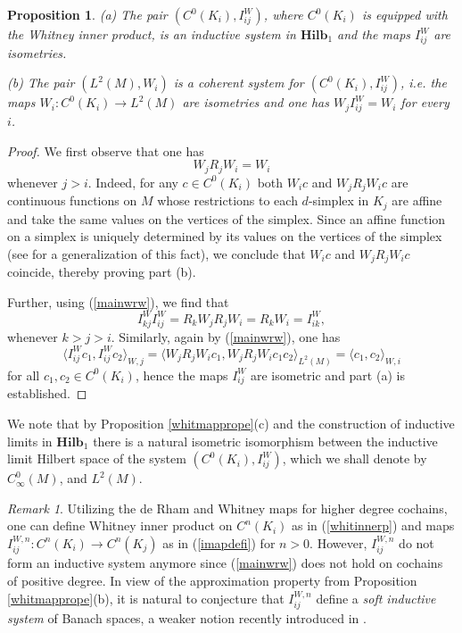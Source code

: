 \documentclass[11pt,reqno]{amsart}
\numberwithin{equation}{section}
\newtheorem{proposition}[theorem]{Proposition}
\theoremstyle{remark}
\newtheorem{remark}[theorem]{Remark}
\theoremstyle{rmdefinition}
\begin{document}
\begin{proposition}\label{indusyswhi}
(a) The pair $( C^0(K_{i}), I_{ij}^{W})$, where $C^0(K_{i})$ is equipped with the Whitney inner product, is an inductive system in $\mathbf{Hilb}_1$  and the maps $I_{ij}^{W}$ are isometries. 

(b) The pair $( L^2(M), W_i)$ is a coherent system for $( C^0(K_{i}), I_{ij}^{W})$, i.e. 
the maps $W_i:  C^0(K_{i}) \rightarrow L^2(M)$ are isometries and one has 
$W_jI_{ij}^{W}=W_i$ for every $i$.

\end{proposition}	
\begin{proof}
We first observe that one has
\begin{equation}\label{mainwrw}
W_jR_jW_i=W_i
\end{equation}
whenever $j>i$. Indeed, for any $c \in  C^0(K_{i})$ both $W_ic$ and $W_jR_jW_ic$ are continuous functions on $M$ whose restrictions to each 
 $d$-simplex in $K_{j}$ are affine and take the same values on the vertices of the simplex. Since an affine function on a simplex is uniquely determined by its values on the vertices of the simplex (see \cite{Do2} for a generalization of this fact), we conclude that $W_ic$ and $W_jR_jW_ic$ coincide, thereby proving part (b).
 
Further, using (\ref{mainwrw}), we find that
 $$I_{kj}^{W}I_{ij}^{W}= R_k W_jR_j W_i =R_k  W_i =I_{ik}^{W},$$
 whenever $k>j>i$. Similarly, again by (\ref{mainwrw}), one has
 $$ \langle I_{ij}^{W}c_1,I_{ij}^{W}c_2\rangle_{W,j} = \langle W_{j}R_j W_ic_1,  W_{j}R_j W_ic_1c_2\rangle_{L^2(M)}= \langle c_1,c_2\rangle_{W,i} $$
for all $c_1,c_2 \in C^0(K_{i})$, hence the maps $I_{ij}^{W}$ are isometric and part (a) is established. 
\end{proof}

We note that by Proposition \ref{whitmapprope}(c) and the construction of inductive limits in $\mathbf{Hilb}_1$ there is a natural isometric isomorphism between the inductive limit Hilbert space of the system $( C^0(K_{i}), I_{ij}^{W})$, which we shall denote by $C^0_{\infty}(M)$, and $L^2(M)$.
\begin{remark}
Utilizing the de Rham and Whitney maps for higher degree cochains, one can define Whitney inner product on $C^n(K_{i})$ as in (\ref{whitinnerp}) and maps $I_{ij}^{W,n}:  C^n(K_{i}) \rightarrow C^n(K_{j})$ as in (\ref{imapdefi}) for $n>0$. However, $I_{ij}^{W,n}$ do not form an inductive system anymore since (\ref{mainwrw}) does not hold on cochains of positive degree. In view of the approximation property from Proposition \ref{whitmapprope}(b), it is natural to conjecture that $I_{ij}^{W,n}$ define a {\em soft inductive system} of Banach spaces, a weaker notion recently introduced in \cite[Section 3]{LSW}.
\end{remark}
\end{document}

